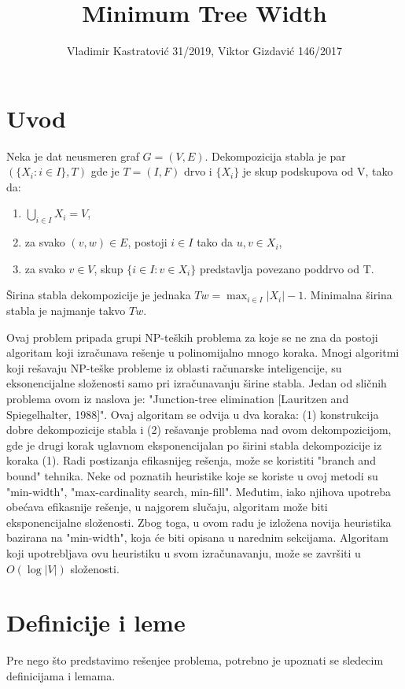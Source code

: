 \documentclass[10pt]{article}
\title{Minimum Tree Width}
\author{Vladimir Kastratović 31/2019, Viktor Gizdavić 146/2017}
\begin{document}
    \maketitle

\renewcommand{\contentsname}{Sadržaj}
\tableofcontents

\section{Uvod}
Neka je dat neusmeren graf $G=\left(V,E\right)$.
Dekompozicija stabla je par $\left(\{X_i:i\in I\},T\right)$ gde je $T=\left(I,F\right)$ drvo i $\{X_i\}$ je skup podskupova od V, tako da:

\begin{enumerate}
    \item $\bigcup_{i\in I} X_i=V$,
    \item za svako $(v,w)\in E$, postoji $i\in I$ tako da $u,v\in X_i$,
    \item za svako $v\in V$, skup $\{i\in I: v\in X_i\}$ predstavlja povezano poddrvo od T.
\end{enumerate}

Širina stabla dekompozicije je jednaka $Tw = \max_{i \in I} \vert X_i\vert-1$. Minimalna širina stabla je najmanje takvo $Tw$.

Ovaj problem pripada grupi NP-teških problema za koje se ne zna da postoji algoritam koji izračunava rešenje u polinomijalno mnogo koraka. Mnogi algoritmi koji rešavaju NP-teške probleme iz oblasti računarske inteligencije, su eksonencijalne složenosti samo pri izračunavanju širine stabla. Jedan od sličnih problema ovom iz naslova je: "Junction-tree elimination [Lauritzen and Spiegelhalter, 1988]". Ovaj algoritam se odvija u dva koraka: (1) konstrukcija dobre dekompozicije stabla i (2) rešavanje problema nad ovom dekompozicijom, gde je drugi korak uglavnom eksponencijalan po širini stabla dekompozicije iz koraka (1). Radi postizanja efikasnijeg rešenja, može se koristiti "branch and bound" tehnika. Neke od poznatih heuristike koje se koriste u ovoj metodi su "min-width", "max-cardinality search, min-fill". Međutim, iako njihova upotreba obećava efikasnije rešenje, u najgorem slučaju, algoritam može biti eksponencijalne složenosti. Zbog toga, u ovom radu je izložena novija heuristika bazirana na "min-width", koja će biti opisana u narednim sekcijama. Algoritam koji upotrebljava ovu heuristiku u svom izračunavanju, može se završiti u $O(\log \vert V\vert)$ složenosti.

\section{Definicije i leme}
Pre nego što predstavimo rešenjee problema, potrebno je upoznati se sledecim definicijama i lemama.
\end{document}
